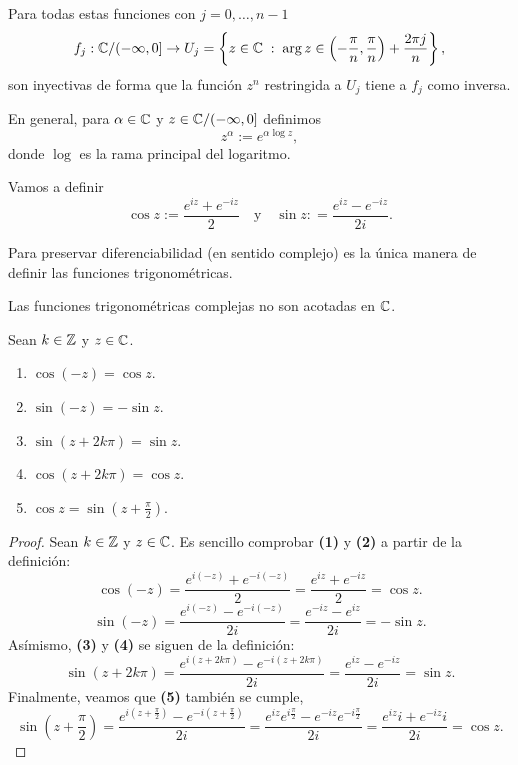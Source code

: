 \begin{observation}
Para todas estas funciones con $\displaystyle j = 0, \ldots, n-1 $ 
\[f_{j} : \mathbb{C} / (-\infty, 0] \to U_{j} = \left\{ z \in \mathbb{C} \; : \; \arg z \in \left(-\frac{\pi }{n}, \frac{\pi }{n}\right)+\frac{2\pi j}{n}\right\}  ,\]
son inyectivas de forma que la función $\displaystyle z^{n} $ restringida a $\displaystyle U_{j} $ tiene a $\displaystyle f_{j} $ como inversa.
\end{observation}
\begin{definition}
	En general, para $\displaystyle \alpha \in \mathbb{C} $ y $\displaystyle z \in \mathbb{C}/(-\infty,0] $ definimos
	\[z^{\alpha }:= e^{\alpha\log z} ,\]
	donde $\displaystyle \log  $ es la rama principal del logaritmo. 
\end{definition}
 
\begin{definition}
Vamos a definir
\[\cos z := \frac{e^{iz}+e^{-iz}}{2} \quad \text{y} \quad \sin z : = \frac{e^{iz}-e^{-iz}}{2i} .\]
\end{definition}
\begin{observation}
Para preservar diferenciabilidad (en sentido complejo) es la única manera de definir las funciones trigonométricas.
\end{observation}
\begin{observation}
Las funciones trigonométricas complejas no son acotadas en $\displaystyle \mathbb{C} $.
\end{observation}
\begin{prop}
Sean $\displaystyle k \in \mathbb{Z} $ y $\displaystyle z \in \mathbb{C} $.
\begin{enumerate}
\item $\displaystyle \cos\left(-z\right)= \cos z $.
\item $\displaystyle \sin\left(-z\right)=-\sin z $.
\item $\displaystyle \sin \left(z + 2k\pi \right)= \sin z $.
\item $\displaystyle \cos\left(z + 2k\pi \right)= \cos z $.
\item $\displaystyle \cos z = \sin\left(z + \frac{\pi }{2}\right) $. 
\end{enumerate}
\end{prop}
\begin{proof}
Sean $\displaystyle k \in \mathbb{Z} $ y $\displaystyle z \in \mathbb{C} $. Es sencillo comprobar \textbf{(1)} y \textbf{(2)} a partir de la definición:
\[\cos\left(-z\right)=\frac{e^{i\left(-z\right)}+e^{-i\left(-z\right)}}{2} = \frac{e^{iz}+e^{-iz}}{2} = \cos z .\]
\[\sin\left(-z\right)=\frac{e^{i\left(-z\right)}-e^{-i\left(-z\right)}}{2i}=\frac{e^{-iz}-e^{iz}}{2i}=-\sin z .\]
Asímismo, \textbf{(3)} y \textbf{(4)} se siguen de la definición:
\[\sin\left(z + 2k\pi \right)=\frac{e^{i\left(z + 2k\pi \right)}-e^{-i\left(z + 2k\pi \right)}}{2i}=\frac{e^{iz}-e^{-iz}}{2i}=\sin z .\]
Finalmente, veamos que \textbf{(5)} también se cumple,
\[\sin\left(z + \frac{\pi }{2}\right)= \frac{e^{i\left(z + \frac{\pi }{2}\right)}-e^{-i\left(z+\frac{\pi }{2}\right)}}{2i} = \frac{e^{iz}e^{i\frac{\pi }{2}}-e^{-iz}e^{-i \frac{\pi }{2}}}{2i}=\frac{e^{iz}i + e^{-iz}i}{2i}=\cos z.\]
\end{proof}

